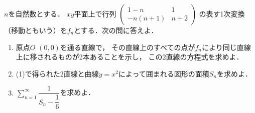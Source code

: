 \documentclass[../../main.tex]{subfiles}
\begin{document}
$n$を自然数とする．
$xy$平面上で行列
$
\begin{pmatrix} 1-n & 1 \\ -n(n+1) & n+2
\end{pmatrix}$
の表す1次変換（移動ともいう）を$f_n$とする．次の問に答えよ．
\begin{enumerate}
  \item 原点$O$ $(0,0)$を通る直線で，
    その直線上のすべての点が$f_n$により同じ直線上に移されるものが2本あることを示し，
    この2直線の方程式を求めよ．
  \item (1)で得られた2直線と曲線$y=x^2$によって囲まれる図形の面積$S_n$を求めよ．
  \item $\displaystyle\sum_{n=1}^\infty\dfrac{1}{S_n-\displaystyle\dfrac{1}{6}}$を求めよ．
\end{enumerate}
\end{document}
